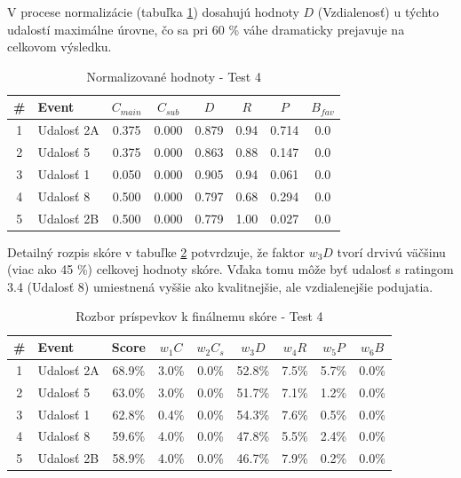 V procese normalizácie (tabuľka \ref{tab:norm_test4}) dosahujú hodnoty $D$ (Vzdialenosť) u týchto udalostí maximálne úrovne, čo sa pri 60 \% váhe dramaticky prejavuje na celkovom výsledku.

\begin{table}[H]
\centering
\small
\begin{tabular}{|c|l|c|c|c|c|c|c|}
\hline
\textbf{\#} & \textbf{Event} & $C_{main}$ & $C_{sub}$ & $D$ & $R$ & $P$ & $B_{fav}$ \\
\hline
1 & Udalosť 2A & 0.375 & 0.000 & 0.879 & 0.94 & 0.714 & 0.0 \\
2 & Udalosť 5  & 0.375 & 0.000 & 0.863 & 0.88 & 0.147 & 0.0 \\
3 & Udalosť 1  & 0.050 & 0.000 & 0.905 & 0.94 & 0.061 & 0.0 \\
4 & Udalosť 8  & 0.500 & 0.000 & 0.797 & 0.68 & 0.294 & 0.0 \\
5 & Udalosť 2B & 0.500 & 0.000 & 0.779 & 1.00 & 0.027 & 0.0 \\
\hline
\end{tabular}
\caption{Normalizované hodnoty - Test 4}
\label{tab:norm_test4}
\end{table}

Detailný rozpis skóre v tabuľke \ref{tab:vysledky_test4} potvrdzuje, že faktor $w_3 D$ tvorí drvivú väčšinu (viac ako 45 \%) celkovej hodnoty skóre. Vďaka tomu môže byť udalosť s ratingom 3.4 (Udalosť 8) umiestnená vyššie ako kvalitnejšie, ale vzdialenejšie podujatia.

\begin{table}[H]
\centering
\small
\begin{tabular}{|c|l|c|c|c|c|c|c|c|}
\hline
\textbf{\#} & \textbf{Event} & \textbf{Score} & $w_1 C$ & $w_2 C_s$ & $w_3 D$ & $w_4 R$ & $w_5 P$ & $w_6 B$ \\
\hline
1 & Udalosť 2A & 68.9\% & 3.0\% & 0.0\% & 52.8\% & 7.5\% & 5.7\% & 0.0\% \\
2 & Udalosť 5  & 63.0\% & 3.0\% & 0.0\% & 51.7\% & 7.1\% & 1.2\% & 0.0\% \\
3 & Udalosť 1  & 62.8\% & 0.4\% & 0.0\% & 54.3\% & 7.6\% & 0.5\% & 0.0\% \\
4 & Udalosť 8  & 59.6\% & 4.0\% & 0.0\% & 47.8\% & 5.5\% & 2.4\% & 0.0\% \\
5 & Udalosť 2B & 58.9\% & 4.0\% & 0.0\% & 46.7\% & 7.9\% & 0.2\% & 0.0\% \\
\hline
\end{tabular}
\caption{Rozbor príspevkov k finálnemu skóre - Test 4}
\label{tab:vysledky_test4}
\end{table}

